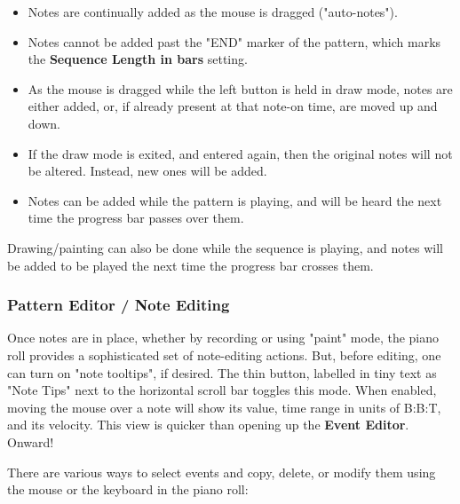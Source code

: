    \begin{itemize}
      \item Notes are continually added as the mouse is dragged ("auto-notes").
      \item Notes cannot be added past the "END" marker of the pattern, which
         marks the \textbf{Sequence Length in bars} setting.
      \item As the mouse is dragged while the left button is held in draw mode,
         notes are either added, or, if already present at that note-on time,
         are moved up and down.
      \item If the draw mode is exited, and entered again, then the original
         notes will not be altered.  Instead, new ones will be added.
      \item Notes can be added while the pattern is playing, and will be heard
         the next time the progress bar passes over them.
   \end{itemize}

   Drawing/painting can also be done while the sequence is playing,
   and notes will be added to be played the next time the progress bar crosses
   them.

\subsubsection{Pattern Editor / Note Editing}
\label{subsubsec:pattern_editor_note_editing}

   Once notes are in place, whether by recording or using "paint" mode,
   the piano roll provides a sophisticated set of note-editing
   actions.
   But, before editing, one can turn on
   "note tooltips", if desired.
   The thin button, labelled in tiny text as "Note Tips"
   next to the horizontal scroll bar toggles this mode.
   When enabled, moving the mouse over a note will show its value, time range
   in units of B:B:T, and its velocity.
   This view is quicker than opening up the \textbf{Event Editor}.
   Onward!

   \setcounter{ItemCounter}{0}      %

   There are various ways to select events and copy, delete, or modify them
   using the mouse or the keyboard in the piano roll:

